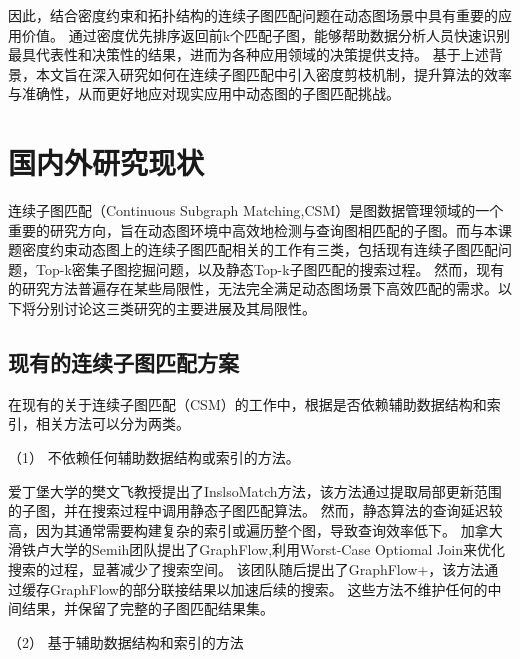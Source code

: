 因此，结合密度约束和拓扑结构的连续子图匹配问题在动态图场景中具有重要的应用价值。
通过密度优先排序返回前k个匹配子图，能够帮助数据分析人员快速识别最具代表性和决策性的结果，进而为各种应用领域的决策提供支持。
基于上述背景，本文旨在深入研究如何在连续子图匹配中引入密度剪枝机制，提升算法的效率与准确性，从而更好地应对现实应用中动态图的子图匹配挑战。
\section{国内外研究现状}
连续子图匹配（Continuous Subgraph Matching,CSM）是图数据管理领域的一个重要的研究方向，旨在动态图环境中高效地检测与查询图相匹配的子图。而与本课题密度约束动态图上的连续子图匹配相关的工作有三类，包括现有连续子图匹配问题，Top-k密集子图挖掘问题，以及静态Top-k子图匹配的搜索过程。
然而，现有的研究方法普遍存在某些局限性，无法完全满足动态图场景下高效匹配的需求。以下将分别讨论这三类研究的主要进展及其局限性。
\subsection{现有的连续子图匹配方案}
在现有的关于连续子图匹配（CSM）的工作\cite{csm-sjtree-DBLP:conf/edbt/ChoudhuryHCAF15,csm-IncIsoMatch-DBLP:conf/sigmod/FanLLTWW11,csm-graphflow-DBLP:conf/sigmod/KankanamgeSMCS17,csm-turboflux-DBLP:conf/sigmod/KimSHLHCSJ18,csm-graphflowpp-DBLP:journals/tods/MhedhbiKS21,csm-symbi-DBLP:journals/pvldb/MinPPGIH21,csm-rapidflow-DBLP:journals/pvldb/SunSHL22}中，根据是否依赖辅助数据结构和索引，相关方法可以分为两类。

（1） 不依赖任何辅助数据结构或索引的方法。

爱丁堡大学的樊文飞教授提出了InslsoMatch\cite{csm-IncIsoMatch-DBLP:conf/sigmod/FanLLTWW11}方法，该方法通过提取局部更新范围的子图，并在搜索过程中调用静态子图匹配算法。
然而，静态算法的查询延迟较高，因为其通常需要构建复杂的索引或遍历整个图，导致查询效率低下。
加拿大滑铁卢大学的Semih团队提出了GraphFlow\cite{csm-graphflow-DBLP:conf/sigmod/KankanamgeSMCS17},利用Worst-Case Optiomal Join来优化搜索的过程，显著减少了搜索空间。
该团队随后提出了GraphFlow+\cite{csm-graphflowpp-DBLP:journals/tods/MhedhbiKS21}，该方法通过缓存GraphFlow的部分联接结果以加速后续的搜索。
这些方法不维护任何的中间结果，并保留了完整的子图匹配结果集。

（2） 基于辅助数据结构和索引的方法


